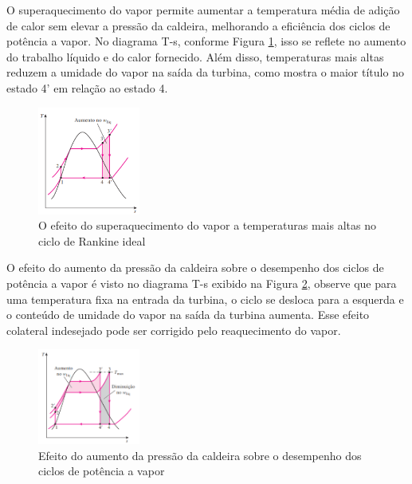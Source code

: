 \documentclass[
	article,			%
	11pt,				%
	oneside,			%
	a4paper,			%
	english,			%
	brazil,				%
	sumario=tradicional
	]{abntex2}
\begin{document}

O superaquecimento do vapor permite aumentar a temperatura média de adição de calor sem elevar a pressão da caldeira, melhorando a eficiência dos ciclos de potência a vapor. No diagrama T-s, conforme Figura \ref{fig:superaqueci}, isso se reflete no aumento do trabalho líquido e do calor fornecido. Além disso, temperaturas mais altas reduzem a umidade do vapor na saída da turbina, como mostra o maior título no estado 4' em relação ao estado 4.

\begin{figure}[h]
	\centering
	\includegraphics[width=0.3\textwidth]{./images/superaqueci.png}
	\caption{O efeito do superaquecimento do vapor a temperaturas mais altas no ciclo de Rankine ideal}
	\label{fig:superaqueci}
\end{figure}


O efeito do aumento da pressão da caldeira sobre o desempenho dos ciclos de potência a vapor é visto no diagrama T-s exibido na Figura \ref{fig:pressao-caldeira}, observe que para uma temperatura fixa na entrada da turbina, o ciclo se desloca para a esquerda e o conteúdo de umidade do vapor na saída da turbina aumenta. Esse efeito colateral indesejado pode ser corrigido pelo reaquecimento do vapor.

\begin{figure}[h]
	\centering
	\includegraphics[width=0.3\textwidth]{./images/pressao-caldeira.png}
	\caption{Efeito do aumento da pressão da caldeira sobre o desempenho dos ciclos de potência a vapor}
	\label{fig:pressao-caldeira}
\end{figure}
\end{document}
